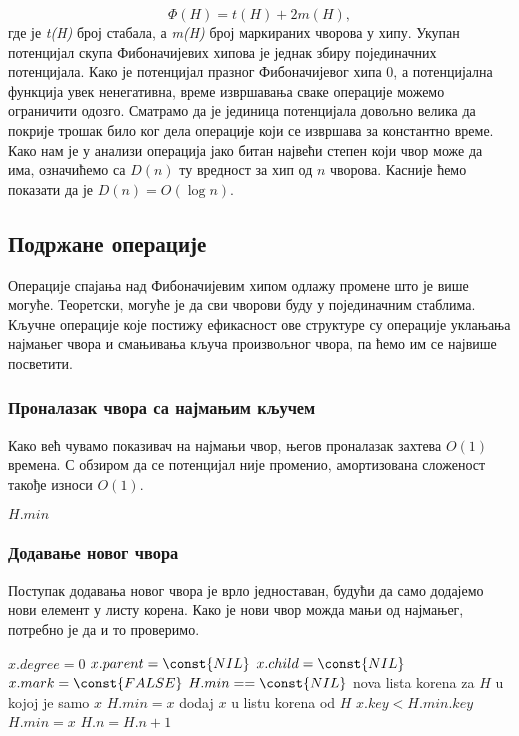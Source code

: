 \documentclass[11pt, a4paper]{article}
\theoremstyle{remark}
\numberwithin{equation}{section}
\begin{document}
	\begin{equation}
		\Phi(H)=t(H)+2m(H),
	\end{equation}
	где је \textit{t(H)} број стабала, а \textit{m(H)} број маркираних чворова у хипу. Укупан потенцијал скупа Фибоначијевих хипова је једнак збиру појединачних потенцијала. Како је потенцијал празног Фибоначијевог хипа $0$, а потенцијална функција увек ненегативна, време извршавања сваке операције можемо ограничити одозго. Сматрамо да је јединица потенцијала довољно велика да покрије трошак било ког дела операције који се извршава за константно време. \\

	\noindent Како нам је у анализи операција јако битан највећи степен који чвор може да има, означићемо са $D(n)$ ту вредност за хип од $n$ чворова. Касније ћемо показати да је $D(n)=O(\log n)$.
	
	\subsection{Подржане операције}
	
	Операције спајања над Фибоначијевим хипом одлажу промене што је више могуће. Теоретски, могуће је да сви чворови буду у појединачним стаблима. Кључне операције које постижу ефикасност ове структуре су операције уклањања најмањег чвора и смањивања кључа произвољног чвора, па ћемо им се највише посветити.
	
	\subsubsection{Проналазак чвора са најмањим кључем}
	
	Како већ чувамо показивач на најмањи чвор, његов проналазак захтева $O(1)$ времена. С обзиром да се потенцијал није променио, амортизована сложеност такође износи $O(1)$.	
	\begin{codebox}
		\li \Return $H.min$
	\end{codebox}
	
	\subsubsection{Додавање новог чвора}
	\noindent Поступак додавања новог чвора је врло једноставан, будући да само додајемо нови елемент у листу корена. Како је нови чвор можда мањи од најмањег, потребно је да и то проверимо. 
	
	\begin{codebox}
		\Procname {\proc{Fib-Heap-Insert}($H$, $x$)}
		\li $x.degree=0$
		\li $x.parent=\const{NIL}$
		\li $x.child=\const{NIL}$
		\li $x.mark=\const{FALSE}$
		\li \If $H.min==\const{NIL}$
		\li \Do nova lista korena za $H$ u kojoj je samo $x$
		\li $H.min=x$
		\End
		\li \Else dodaj $x$ u listu korena od $H$
		\li \Do \If $x.key<H.min.key$
		\li \Do $H.min=x$
		\End \End
		\li $H.n=H.n+1$
	\end{codebox}
\end{document}

